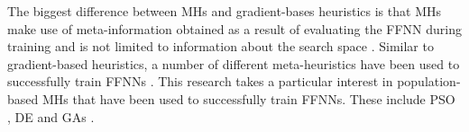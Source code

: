 The biggest difference between \acp{MH} and gradient-bases heuristics is that
\acp{MH} make use of meta-information obtained as a result of evaluating the \acs{FFNN} during training and is not limited to information about the search space \cite{ref:blum:2003}. Similar to gradient-based heuristics, a number of different meta-heuristics have been used to successfully train \acp{FFNN} \cite{ref:rakitianskaia:2012, ref:vanwyk:2014, ref:espinal:2011, ref:gupta:1999}. This research takes a particular interest in population-based \acp{MH} that have been used to successfully train \acp{FFNN}. These include \acf{PSO} \cite{ref:shi:1998}, \acf{DE} \cite{ref:price:2006} and \acfp{GA} \cite{ref:fraser:1957}.